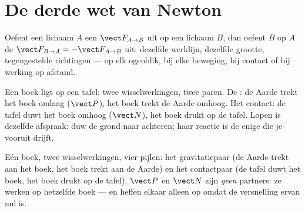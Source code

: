 \section{De derde wet van Newton}

\begin{theorem}\label{thm:g12:newtons-laws:third}
Oefent een lichaam $A$ een  $\vect F_{A \to B}$ uit op een lichaam $B$, dan
oefent $B$ op $A$ de  $\vect F_{B \to A} = -\vect F_{A \to B}$ uit: dezelfde
werklijn, dezelfde grootte, tegengestelde richtingen --- op elk ogenblik, bij elke
beweging, bij contact of bij werking op afstand.
\end{theorem}
\admitted

\begin{example}\label{ex:g12:newtons-laws:book}
Een boek ligt op een tafel: twee wisselwerkingen, twee paren. De : de Aarde
trekt het boek omlaag ($\vect P$), het boek trekt de Aarde omhoog. Het contact: de
tafel duwt het boek omhoog ($\vect N$), het boek drukt op de tafel. Lopen is dezelfde
afspraak: duw de grond naar achteren; haar reactie is de enige  die je vooruit
drijft.
\end{example}

\begin{omfigure}

{\small Eén boek, twee wisselwerkingen, vier pijlen: het gravitatiepaar (de Aarde
trekt aan het boek, het boek trekt aan de Aarde) en het contactpaar (de tafel duwt
het boek, het boek drukt op de tafel). $\vect P$ en $\vect N$ zijn \emph{geen}
partners: ze werken op hetzelfde boek --- en heffen elkaar alleen op omdat de
versnelling ervan nul is.}
\end{omfigure}


